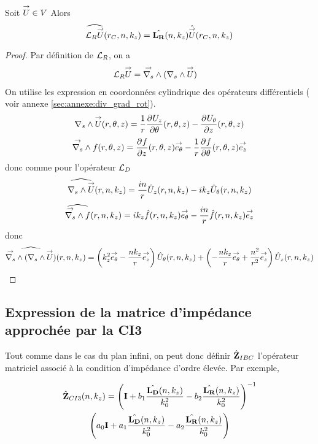     \begin{prop}
      Soit \(\vect{U} \in V\)
      Alors
      \begin{equation*}
        \widehat{\LR \vect{U}} (r_C,n,k_z) = \hat{\mLR}(n,k_z) \hat{\vect{U}}(r_C,n,k_z)
      \end{equation*}
    \end{prop}

    \begin{proof}
      Par définition de \(\LR\), on a
      \begin{align*}
        \LR \vect{U} & = \vrots{} (\rots{} \vect{U})
      \end{align*}
      On utilise les expression en coordonnées cylindrique des opérateurs différentiels ( voir annexe \ref{sec:annexe:div_grad_rot}).
      \begin{align*}
        \rots{\vect{U}}(r,\theta,z) = \frac{1}{r}\ddr{\theta}{U_z}(r,\theta,z) - \ddr{z}{U_\theta}(r,\theta,z)
      \end{align*}
      \begin{align*}
        \vrots{f}(r,\theta,z) = \ddr{z}{f}(r,\theta,z)\vect{e_\theta} - \frac{1}{r}\ddr{\theta}{f}(r,\theta,z)\vect{e_z}
      \end{align*}
      donc comme pour l'opérateur \(\LD\)
      \begin{align*}
        \widehat{\rots{\vect{U}}}(r,n,k_z) = \frac{in}{r}{\hat{U}_z}(r,n,k_z) - ik_z{\hat{U}_\theta}(r,n,k_z)
      \end{align*}
      \begin{align*}
        \widehat{\vrots{f}}(r,n,k_z) =  ik_z\hat{f}(r,n,k_z)\vect{e_\theta} - \frac{in}{r}\hat{f}(r,n,k_z)\vect{e_z}
      \end{align*}
      donc
      \begin{align*}
        \widehat{\vrots (\rots{\vect{U}})}(r,n,k_z) =  \left({k_z^2}\vect{e_\theta} - \frac{nk_z}{r}\vect{e_z}\right){\hat{U}_\theta}(r,n,k_z) + \left(-\frac{nk_z}{r}\vect{e_\theta} + \frac{n^2}{r^2}\vect{e_z}\right){\hat{U}_z}(r,n,k_z)
      \end{align*}

    \end{proof}

  \subsection{Expression de la matrice d'impédance approchée par la CI3}

    Tout comme dans le cas du plan infini, on peut donc définir \(\hat{\mZ}_{IBC}\) l’opérateur matriciel associé à la condition d'impédance d'ordre élevée. Par exemple,

    \begin{multline}
        \hat{\mZ}_{CI3}(n,k_z) = \left(\mI + b_1 \frac{\hat{\mLD}(n,k_z)}{k_0^2} - b_2 \frac{\hat{\mLR}(n,k_z)}{k_0^2} \right)^{-1}\\
        \left(a_0 \mI + a_1 \frac{\hat{\mLD}(n,k_z)}{k_0^2} - a_2 \frac{\hat{\mLR}(n,k_z)}{k_0^2}\right)
    \end{multline}
